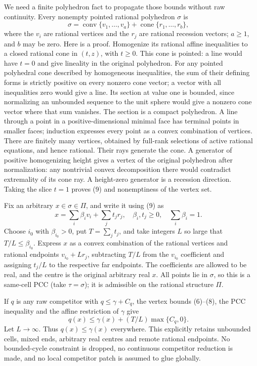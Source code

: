 \documentclass[
  10pt,
]{article}
\begin{document}
We need a finite polyhedron fact to propagate those bounds without raw
continuity. Every nonempty pointed rational polyhedron \(\sigma\) is \[
 \sigma=\operatorname{conv}\{v_1,\ldots,v_a\}
                  +\operatorname{cone}\{r_1,\ldots,r_b\},
 \tag{9}
\] where the \(v_i\) are rational vertices and the \(r_j\) are rational
recession vectors; \(a\geq1\), and \(b\) may be zero. Here is a proof.
Homogenize its rational affine inequalities to a closed rational cone in
\((t,z)\), with \(t\geq0\). This cone is pointed: a line would have
\(t=0\) and give lineality in the original polyhedron. For any pointed
polyhedral cone described by homogeneous inequalities, the sum of their
defining forms is strictly positive on every nonzero cone vector; a
vector with all inequalities zero would give a line. Its section at
value one is bounded, since normalizing an unbounded sequence to the
unit sphere would give a nonzero cone vector where that sum vanishes.
The section is a compact polyhedron. A line through a point in a
positive-dimensional minimal face has terminal points in smaller faces;
induction expresses every point as a convex combination of vertices.
There are finitely many vertices, obtained by full-rank selections of
active rational equations, and hence rational. Their rays generate the
cone. A generator of positive homogenizing height gives a vertex of the
original polyhedron after normalization: any nontrivial convex
decomposition there would contradict extremality of its cone ray. A
height-zero generator is a recession direction. Taking the slice \(t=1\)
proves (9) and nonemptiness of the vertex set.

Fix an arbitrary \(x\in\sigma\in\Pi\), and write it using (9) as \[
 x=\sum_i\beta_i v_i+\sum_jt_jr_j,
 \quad \beta_i,t_j\geq0,\quad\sum_i\beta_i=1.
\] Choose \(i_0\) with \(\beta_{i_0}>0\), put \(T=\sum_jt_j\), and take
integers \(L\) so large that \(T/L\leq\beta_{i_0}\). Express \(x\) as a
convex combination of the rational vertices and rational endpoints
\(v_{i_0}+Lr_j\), subtracting \(T/L\) from the \(v_{i_0}\) coefficient
and assigning \(t_j/L\) to the respective far endpoints. The
coefficients are allowed to be real, and the centre is the original
arbitrary real \(x\). All points lie in \(\sigma\), so this is a
same-cell PCC (take \(\tau=\sigma\)); it is admissible on the rational
structure \(\Pi\).

If \(q\) is any raw competitor with \(q\leq\gamma+C_q\), the vertex
bounds (6)--(8), the PCC inequality and the affine restriction of
\(\gamma\) give \[
 q(x)\leq\gamma(x)+(T/L)\max\{C_q,0\}.
\] Let \(L\to\infty\). Thus \(q(x)\leq\gamma(x)\) everywhere. This
explicitly retains unbounded cells, mixed ends, arbitrary real centres
and remote rational endpoints. No bounded-cycle constraint is dropped,
no continuous competitor reduction is made, and no local competitor
patch is assumed to glue globally.
\end{document}
